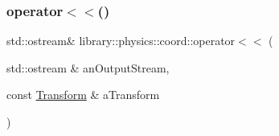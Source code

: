 \subsubsection{\texorpdfstring{operator$<$$<$()}{operator<<()}\hspace{0.1cm}{\footnotesize\ttfamily [5/5]}}
{\footnotesize\ttfamily std\+::ostream\& library\+::physics\+::coord\+::operator$<$$<$ (\begin{DoxyParamCaption}\item[{std\+::ostream \&}]{an\+Output\+Stream,  }\item[{const \hyperlink{classlibrary_1_1physics_1_1coord_1_1_transform}{Transform} \&}]{a\+Transform }\end{DoxyParamCaption})}

